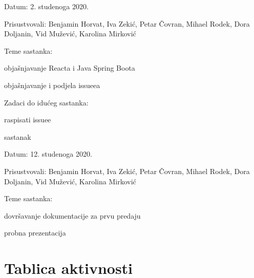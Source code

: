 \begin{packed_enum}
		\item[] \begin{packed_item}
			\item Datum: 2. studenoga 2020.
			\item Prisustvovali: Benjamin Horvat, Iva Zekić, Petar Čovran, Mihael Rodek, Dora Doljanin, Vid Mužević, Karolina Mirković
			\item Teme sastanka:
			\begin{packed_item}
				\item  objašnjavanje Reacta i Java Spring Boota
				\item  objašnjavanje i podjela issueea
			\end{packed_item}
			\item Zadaci do idućeg sastanka:
			\begin{packed_item}
				\item  raspisati issuee
			\end{packed_item}
		\end{packed_item}
		
		\item sastanak
		
		\item[] \begin{packed_item}
			\item Datum: 12. studenoga 2020.
			\item Prisustvovali: Benjamin Horvat, Iva Zekić, Petar Čovran, Mihael Rodek, Dora Doljanin, Vid Mužević, Karolina Mirković
			\item Teme sastanka:
			\begin{packed_item}
				\item  dovršavanje dokumentacije za prvu predaju
				\item  probna prezentacija
			\end{packed_item}
		\end{packed_item}
			
			
		\end{packed_enum}
		
		\eject
		\section*{Tablica aktivnosti}
					
						
			

